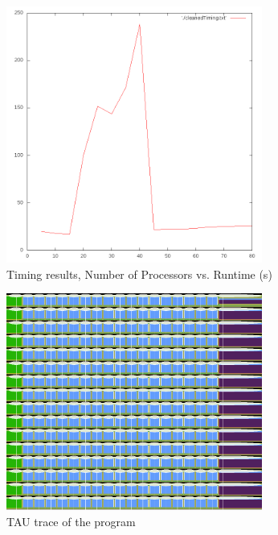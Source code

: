 \documentclass[12pt]{article}
\begin{document}
\begin{figure}[ht]
\centering
\caption{ Timing results, Number of Processors vs. Runtime (s)}
\includegraphics[width=0.75\textwidth]{output.png}
\end{figure}
\begin{figure}[ht]
\centering
\caption{TAU trace of the program}
\includegraphics[width=0.75\textwidth]{trace.png}
\end{figure}
\end{document}
